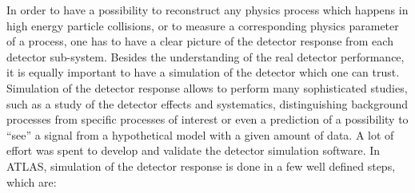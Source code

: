 In order to have a possibility to reconstruct any physics process which happens in high energy particle collisions, or to measure a corresponding physics parameter of a process,
one has to have a clear picture of the detector response from each detector sub-system. Besides the understanding of the real detector performance, it is equally important to have 
a simulation of the detector which one can trust. Simulation of the detector response allows to perform many sophisticated studies, such as a study of the detector effects and systematics,
distinguishing background processes from specific processes of interest or even a prediction of a possibility to ``see'' a signal from a hypothetical model with a given amount of data.
A lot of effort was spent to develop and validate the detector simulation software. In ATLAS, simulation of the detector response is done in a few well defined steps, which are:
